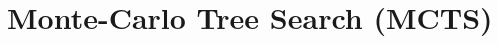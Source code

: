 \documentclass{article}
\begin{document}
\tableofcontents
\newpage

\section{Monte-Carlo Tree Search (MCTS)}
\newpage
\end{document}
